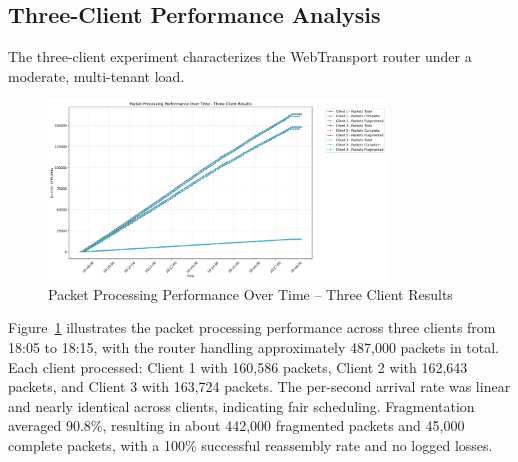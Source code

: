 \subsection{Three-Client Performance Analysis}
The three-client experiment characterizes the WebTransport router under a moderate, multi-tenant load.
\begin{figure}[h!]
\centering
\includegraphics[width=0.8\textwidth]{Evaluation/packet_processing_by_client_three-client-results.png}
\caption{Packet Processing Performance Over Time – Three Client Results}
\label{fig:packet-processing-three-clients}
\end{figure}
Figure~\ref{fig:packet-processing-three-clients} illustrates the packet processing performance across three clients from 18:05 to 18:15, with the router handling approximately 487,000 packets in total. Each client processed: Client 1 with 160,586 packets, Client 2 with 162,643 packets, and Client 3 with 163,724 packets. The per-second arrival rate was linear and nearly identical across clients, indicating fair scheduling. Fragmentation averaged 90.8\%, resulting in about 442,000 fragmented packets and 45,000 complete packets, with a 100\% successful reassembly rate and no logged losses.\

